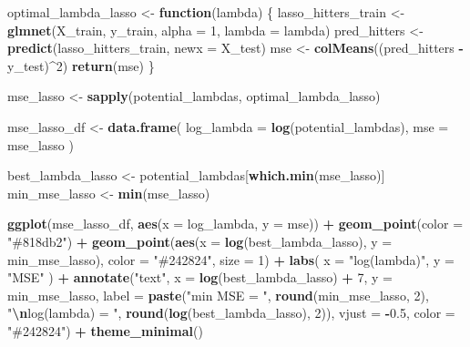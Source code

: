 \documentclass[
]{article}
\newenvironment{Shaded}{\begin{snugshade}}{\end{snugshade}}
\newcommand{\AttributeTok}[1]{\textcolor[rgb]{0.13,0.29,0.53}{#1}}
\newcommand{\ControlFlowTok}[1]{\textcolor[rgb]{0.13,0.29,0.53}{\textbf{#1}}}
\newcommand{\DecValTok}[1]{\textcolor[rgb]{0.00,0.00,0.81}{#1}}
\newcommand{\FloatTok}[1]{\textcolor[rgb]{0.00,0.00,0.81}{#1}}
\newcommand{\FunctionTok}[1]{\textcolor[rgb]{0.13,0.29,0.53}{\textbf{#1}}}
\newcommand{\NormalTok}[1]{#1}
\newcommand{\OtherTok}[1]{\textcolor[rgb]{0.56,0.35,0.01}{#1}}
\newcommand{\SpecialCharTok}[1]{\textcolor[rgb]{0.81,0.36,0.00}{\textbf{#1}}}
\newcommand{\StringTok}[1]{\textcolor[rgb]{0.31,0.60,0.02}{#1}}
\begin{document}
\begin{Shaded}
\begin{Highlighting}[]
\NormalTok{optimal\_lambda\_lasso }\OtherTok{\textless{}{-}} \ControlFlowTok{function}\NormalTok{(lambda) \{}
\NormalTok{  lasso\_hitters\_train }\OtherTok{\textless{}{-}} \FunctionTok{glmnet}\NormalTok{(X\_train, y\_train, }\AttributeTok{alpha =} \DecValTok{1}\NormalTok{, }\AttributeTok{lambda =}\NormalTok{ lambda)}
\NormalTok{  pred\_hitters }\OtherTok{\textless{}{-}} \FunctionTok{predict}\NormalTok{(lasso\_hitters\_train, }\AttributeTok{newx =}\NormalTok{ X\_test)}
\NormalTok{  mse }\OtherTok{\textless{}{-}} \FunctionTok{colMeans}\NormalTok{((pred\_hitters }\SpecialCharTok{{-}}\NormalTok{ y\_test)}\SpecialCharTok{\^{}}\DecValTok{2}\NormalTok{)}
  \FunctionTok{return}\NormalTok{(mse)}
\NormalTok{\}}

\NormalTok{mse\_lasso }\OtherTok{\textless{}{-}} \FunctionTok{sapply}\NormalTok{(potential\_lambdas, optimal\_lambda\_lasso)}

\NormalTok{mse\_lasso\_df }\OtherTok{\textless{}{-}} \FunctionTok{data.frame}\NormalTok{(}
  \AttributeTok{log\_lambda =} \FunctionTok{log}\NormalTok{(potential\_lambdas),}
  \AttributeTok{mse =}\NormalTok{ mse\_lasso}
\NormalTok{)}

\NormalTok{best\_lambda\_lasso }\OtherTok{\textless{}{-}}\NormalTok{ potential\_lambdas[}\FunctionTok{which.min}\NormalTok{(mse\_lasso)]}
\NormalTok{min\_mse\_lasso }\OtherTok{\textless{}{-}} \FunctionTok{min}\NormalTok{(mse\_lasso)}

\FunctionTok{ggplot}\NormalTok{(mse\_lasso\_df, }\FunctionTok{aes}\NormalTok{(}\AttributeTok{x =}\NormalTok{ log\_lambda, }\AttributeTok{y =}\NormalTok{ mse)) }\SpecialCharTok{+}
  \FunctionTok{geom\_point}\NormalTok{(}\AttributeTok{color =} \StringTok{"\#818db2"}\NormalTok{) }\SpecialCharTok{+}
  \FunctionTok{geom\_point}\NormalTok{(}\FunctionTok{aes}\NormalTok{(}\AttributeTok{x =} \FunctionTok{log}\NormalTok{(best\_lambda\_lasso), }\AttributeTok{y =}\NormalTok{ min\_mse\_lasso), }\AttributeTok{color =} \StringTok{"\#242824"}\NormalTok{, }\AttributeTok{size =} \DecValTok{1}\NormalTok{) }\SpecialCharTok{+}
  \FunctionTok{labs}\NormalTok{(}
    \AttributeTok{x =} \StringTok{"log(lambda)"}\NormalTok{,}
    \AttributeTok{y =} \StringTok{"MSE"}
\NormalTok{  ) }\SpecialCharTok{+}
  \FunctionTok{annotate}\NormalTok{(}\StringTok{"text"}\NormalTok{, }\AttributeTok{x =} \FunctionTok{log}\NormalTok{(best\_lambda\_lasso) }\SpecialCharTok{+} \DecValTok{7}\NormalTok{, }\AttributeTok{y =}\NormalTok{ min\_mse\_lasso,}
           \AttributeTok{label =} \FunctionTok{paste}\NormalTok{(}\StringTok{"min MSE = "}\NormalTok{, }\FunctionTok{round}\NormalTok{(min\_mse\_lasso, }\DecValTok{2}\NormalTok{),}
                         \StringTok{"}\SpecialCharTok{\textbackslash{}n}\StringTok{log(lambda) = "}\NormalTok{, }\FunctionTok{round}\NormalTok{(}\FunctionTok{log}\NormalTok{(best\_lambda\_lasso), }\DecValTok{2}\NormalTok{)),}
           \AttributeTok{vjust =} \SpecialCharTok{{-}}\FloatTok{0.5}\NormalTok{, }\AttributeTok{color =} \StringTok{"\#242824"}\NormalTok{) }\SpecialCharTok{+}
  \FunctionTok{theme\_minimal}\NormalTok{()}
\end{Highlighting}
\end{Shaded}
\end{document}
